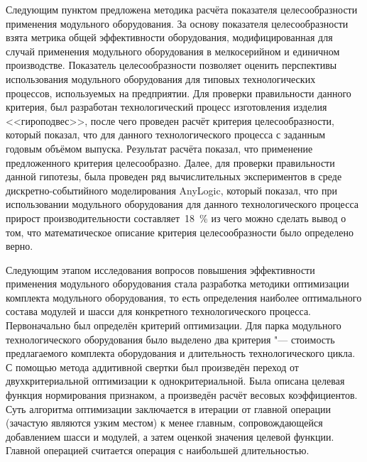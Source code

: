 Следующим пунктом предложена методика расчёта показателя целесообразности применения модульного оборудования. За основу показателя целесообразности взята метрика общей эффективности оборудования, модифицированная для случай применения модульного оборудования в мелкосерийном и единичном производстве. Показатель целесообразности позволяет оценить перспективы использования модульного оборудования для типовых технологических процессов, используемых на предприятии. Для проверки правильности данного критерия, был разработан технологический процесс изготовления изделия <<гироподвес>>, после чего проведен расчёт критерия целесообразности, который показал, что для данного технологического процесса с заданным годовым объёмом выпуска. Результат расчёта показал, что применение предложенного критерия целесообразно. Далее, для проверки правильности данной гипотезы, была проведен ряд вычислительных экспериментов в среде дискретно-событийного моделирования AnyLogic, который показал, что при использовании модульного оборудования для данного технологического процесса прирост производительности составляет~\SI{18}{\percent} из чего можно сделать вывод о том, что математическое описание критерия целесообразности было определено верно.

Следующим этапом исследования вопросов повышения эффективности применения модульного оборудования стала разработка методики оптимизации комплекта модульного оборудования, то есть определения наиболее оптимального состава модулей и шасси для конкретного технологического процесса. Первоначально был определён критерий оптимизации. Для парка модульного технологического оборудования было выделено два критерия "--- стоимость предлагаемого комплекта оборудования и длительность технологического цикла. С помощью метода аддитивной свертки был произведён переход от двухкритериальной оптимизации к однокритериальной. Была описана целевая функция нормирования признаком, а произведён расчёт весовых коэффициентов. Суть алгоритма оптимизации заключается в итерации от главной операции (зачастую являются узким местом)  к менее главным, сопровождающейся добавлением шасси и модулей, а затем оценкой значения целевой функции. Главной операцией считается операция с наибольшей длительностью. 

\FloatBarrier